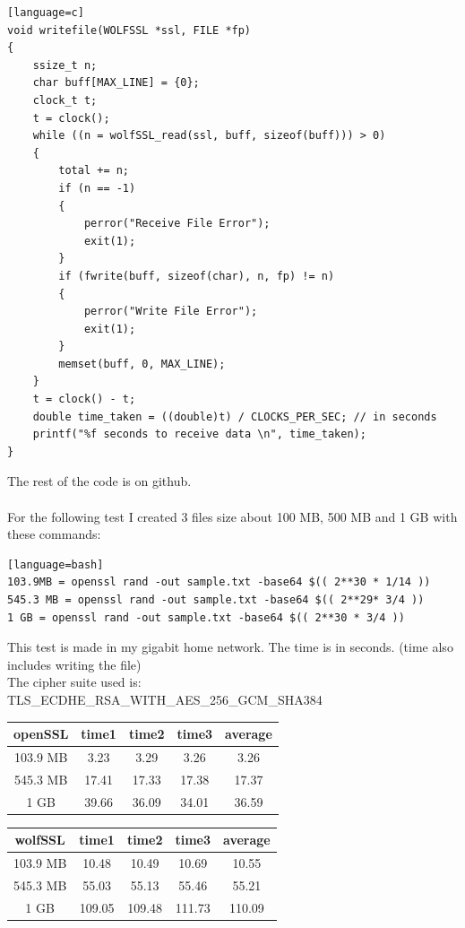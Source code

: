 \documentclass[a4paper,12pt]{report}
\begin{document}
\begin{lstlisting}[caption={wolfSSL function},captionpos=b][language=c]
void writefile(WOLFSSL *ssl, FILE *fp)
{
    ssize_t n;
    char buff[MAX_LINE] = {0};
    clock_t t;
    t = clock();
    while ((n = wolfSSL_read(ssl, buff, sizeof(buff))) > 0)
    {
        total += n;
        if (n == -1)
        {
            perror("Receive File Error");
            exit(1);
        }
        if (fwrite(buff, sizeof(char), n, fp) != n)
        {
            perror("Write File Error");
            exit(1);
        }
        memset(buff, 0, MAX_LINE);
    }
    t = clock() - t;
    double time_taken = ((double)t) / CLOCKS_PER_SEC; // in seconds
    printf("%f seconds to receive data \n", time_taken);
}
\end{lstlisting}
The rest of the code is on github.
\\\\For the following test I created 3 files size about 100 MB, 500 MB and 1 GB with these commands:
\begin{lstlisting}[caption={openSSL commands},captionpos=b][language=bash]
103.9MB = openssl rand -out sample.txt -base64 $(( 2**30 * 1/14 ))
545.3 MB = openssl rand -out sample.txt -base64 $(( 2**29* 3/4 ))
1 GB = openssl rand -out sample.txt -base64 $(( 2**30 * 3/4 ))
\end{lstlisting}

This test is made in my gigabit home network.
The time is in seconds. (time also includes writing the file)
\\The cipher suite used is: TLS\_ECDHE\_RSA\_WITH\_AES\_256\_GCM\_SHA384

\begin{tabular}{ ||c|c|c|c|c|| } 
 \hline
 \textbf{openSSL} & time1 & time2 & time3 & average \\ 
 \hline
 103.9 MB & 3.23 & 3.29 & 3.26  & 3.26\\ 
 \hline
 545.3 MB & 17.41 & 17.33 & 17.38 & 17.37 \\ 
 \hline
 1 GB & 39.66 & 36.09 & 34.01 & 36.59\\ 
 \hline
\end{tabular}
\newline
\newline

\begin{tabular}{ ||c|c|c|c|c|| } 
 \hline
 \textbf{wolfSSL} & time1 & time2 & time3 & average \\ 
 \hline
 103.9 MB & 10.48 & 10.49 & 10.69  & 10.55\\ 
 \hline
 545.3 MB & 55.03 & 55.13 & 55.46 & 55.21\\ 
 \hline
 1 GB & 109.05 & 109.48 & 111.73& 110.09 \\ 
 \hline
\end{tabular}
\newline
\end{document}

